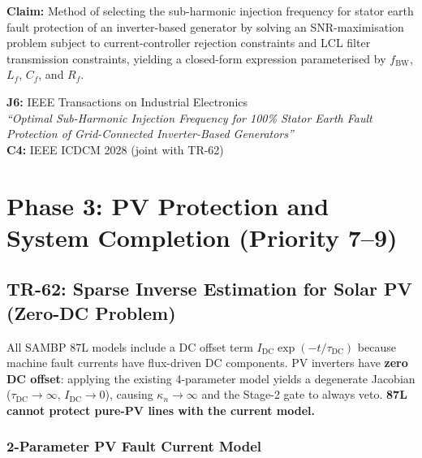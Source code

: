 \documentclass[12pt, a4paper]{report}
\begin{document}
\begin{tcolorbox}[ipbox, title={IP — Patent Family P5}]
\textbf{Claim:} Method of selecting the sub-harmonic injection frequency for stator earth fault protection of an inverter-based generator by solving an SNR-maximisation problem subject to current-controller rejection constraints and LCL filter transmission constraints, yielding a closed-form expression parameterised by $f_\mathrm{BW}$, $L_f$, $C_f$, and $R_f$.
\end{tcolorbox}

\begin{tcolorbox}[pubbox, title={Publications — TR-61}]
\textbf{J6:} IEEE Transactions on Industrial Electronics\\
\textit{``Optimal Sub-Harmonic Injection Frequency for 100\% Stator Earth Fault Protection of Grid-Connected Inverter-Based Generators''}\\[4pt]
\textbf{C4:} IEEE ICDCM 2028 (joint with TR-62)
\end{tcolorbox}

\chapter{Phase 3: PV Protection and System Completion (Priority 7--9)}

\section{TR-62: Sparse Inverse Estimation for Solar PV (Zero-DC Problem)}

\begin{tcolorbox}[gapbox, title={Research Gap — TR-62}]
All SAMBP 87L models include a DC offset term $I_\mathrm{DC}\exp(-t/\tau_\mathrm{DC})$ because machine fault currents have flux-driven DC components. PV inverters have \textbf{zero DC offset}: applying the existing 4-parameter model yields a degenerate Jacobian ($\tau_\mathrm{DC} \to \infty$, $I_\mathrm{DC} \to 0$), causing $\kappa_n \to \infty$ and the Stage-2 gate to always veto. \textbf{87L cannot protect pure-PV lines with the current model.}
\end{tcolorbox}

\subsection{2-Parameter PV Fault Current Model}
\end{document}
